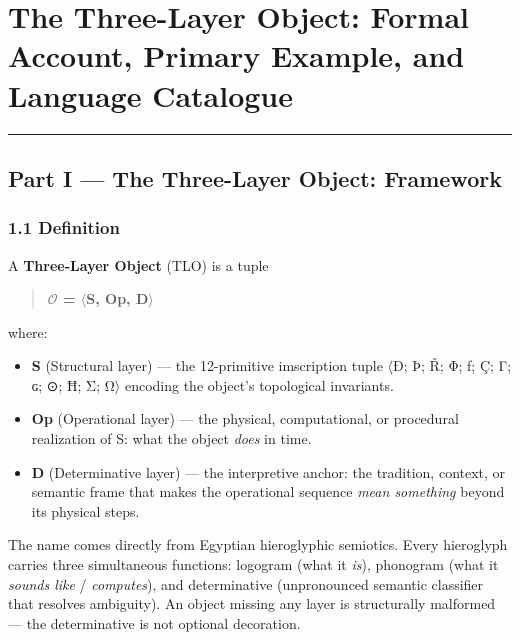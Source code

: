 \documentclass[
  11pt,
  a4paper,
]{article}
\author{}
\date{}
\providecommand{\tightlist}{%
  \setlength{\itemsep}{0pt}\setlength{\parskip}{0pt}}
\begin{document}
\section{The Three-Layer Object: Formal Account, Primary Example, and
Language
Catalogue}\label{the-three-layer-object-formal-account-primary-example-and-language-catalogue}

\begin{center}\rule{0.5\linewidth}{0.5pt}\end{center}

\subsection{Part I --- The Three-Layer Object:
Framework}\label{part-i-the-three-layer-object-framework}

\subsubsection{1.1 Definition}\label{definition}

A \textbf{Three-Layer Object} (TLO) is a tuple

\begin{quote}
\textbf{\(\mathcal{O}\) = \(\langle\)S, Op, D\(\rangle\)}
\end{quote}

where:

\begin{itemize}
\tightlist
\item
  \textbf{S} (Structural layer) --- the 12-primitive imscription tuple
  \(\langle\)Ð; Þ; Ř; Φ; ƒ; Ç; Γ; ɢ; ⊙; Ħ; Σ; Ω\(\rangle\) encoding the object's topological
  invariants.
\item
  \textbf{Op} (Operational layer) --- the physical, computational, or
  procedural realization of S: what the object \emph{does} in time.
\item
  \textbf{D} (Determinative layer) --- the interpretive anchor: the
  tradition, context, or semantic frame that makes the operational
  sequence \emph{mean something} beyond its physical steps.
\end{itemize}

The name comes directly from Egyptian hieroglyphic semiotics. Every
hieroglyph carries three simultaneous functions: logogram (what it
\emph{is}), phonogram (what it \emph{sounds like} / \emph{computes}),
and determinative (unpronounced semantic classifier that resolves
ambiguity). An object missing any layer is structurally malformed ---
the determinative is not optional decoration.
\end{document}
